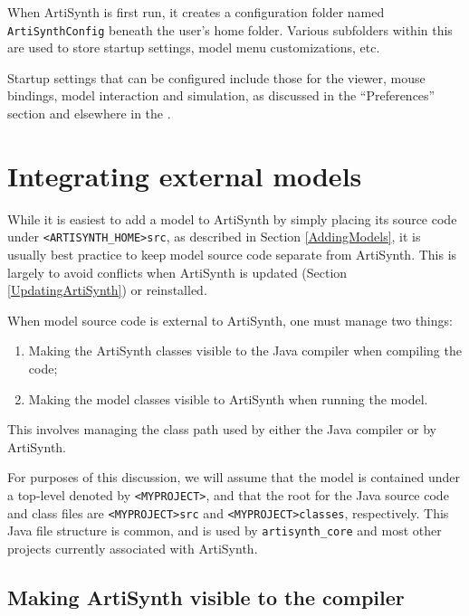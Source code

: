 When ArtiSynth is first run, it creates a configuration folder named
{\tt ArtiSynthConfig} beneath the user's home folder. Various
subfolders within this are used to store startup settings, model menu
customizations, etc.

Startup settings that can be configured include those for the viewer,
mouse bindings, model interaction and simulation, as discussed in the
``Preferences'' section and elsewhere in the
.

\section{Integrating external models}
\label{IntegratingExternalModels}

While it is easiest to add a model to ArtiSynth by simply placing its
source code under {\tt <ARTISYNTH\_HOME>\SEP src}, as described in
Section \ref{AddingModels}, it is usually best practice to keep model
source code separate from ArtiSynth. This is largely to avoid
conflicts when ArtiSynth is updated (Section \ref{UpdatingArtiSynth})
or reinstalled.

When model source code is external to ArtiSynth, one must manage two
things:

\begin{enumerate}

\item Making the ArtiSynth classes visible to the Java compiler
when compiling the code;

\item Making the model classes visible to ArtiSynth when running
the model.

\end{enumerate}

This involves managing the class path used by either the Java compiler
or by ArtiSynth.

For purposes of this discussion, we will assume that the model is
contained under a top-level \directory{} denoted by {\tt <MYPROJECT>},
and that the root \directories{} for the Java source code and class
files are {\tt <MYPROJECT>\SEP src} and
\pdfbreak
{\tt <MYPROJECT>\SEP classes}, respectively. This Java file structure
is common, and is used by {\tt artisynth\_core} and most other
projects currently associated with ArtiSynth.

\subsection{Making ArtiSynth visible to the compiler}

